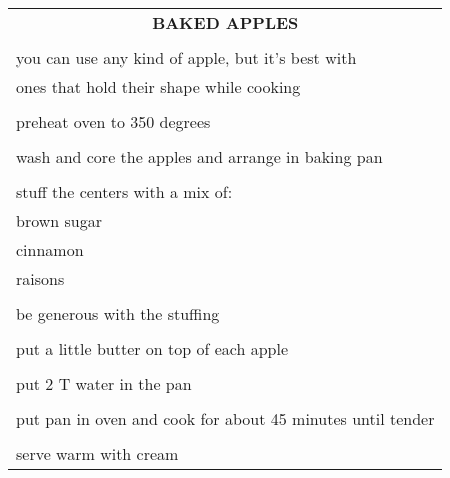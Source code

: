 \documentclass[8pt]{report}
\begin{document}
\newpage

\centering

\begin{tabular}{|l|} \hline	%
 
\multicolumn{1}{|c|}{\textbf{BAKED APPLES}}
\\
\\

\index{desserts!baked apples} \index{baked apples}\index{apple!baked}

you can use any kind of apple, but it's best with\\
ones that hold their shape while cooking\\
\\
preheat oven to 350 degrees\\
\\
wash and core the apples and arrange in baking pan\\
\\
stuff the centers with a mix of:\\
\hspace{0.5 in}	brown sugar\\
\hspace{0.5 in}	cinnamon\\
\hspace{0.5 in}	raisons\\
\\
be generous with the stuffing\\
\\
put a little butter on top of each apple\\
\\
put 2 T water in the pan\\
\\
put pan in oven and cook for about 45 minutes until tender\\
\\
serve warm with cream\\


\hline

\end{tabular}

\newpage

\centering
\end{document}
